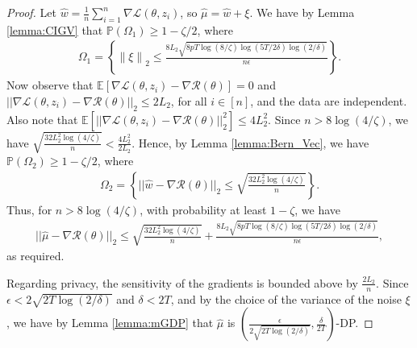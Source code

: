 \documentclass{article}
\begin{document}
\begin{proof}
Let $\widehat{w} = \frac{1}{n}\sum_{i = 1}^n\nabla \mathcal{L}(\theta, z_i)$, so $\widehat{\mu} = \widehat{w} + \xi$. We have by Lemma \ref{lemma:CIGV} that $\mathbb{P}(\Omega_1) \geq 1 - \zeta/2$, where
\begin{align*}
\Omega_1 = \left\{\left\|\xi\right\|_2 \leq \frac{8L_2\sqrt{8pT\log(8/\zeta)\log(5T/2\delta)\log(2/\delta)}}{n\epsilon} \right\}.
\end{align*}
Now observe that $\mathbb{E}[\nabla \mathcal{L}(\theta, z_i) - \nabla \mathcal{R}(\theta)] = 0$ and $||\nabla \mathcal{L}(\theta, z_i) - \nabla \mathcal{R}(\theta)||_2 \leq 2L_2$, for all $i \in [n]$, and the data are independent. Also note that $\mathbb{E}\left[||\nabla \mathcal{L}(\theta, z_i) - \nabla \mathcal{R}(\theta)||_2^2\right] \leq 4L_2^2$. Since $n > 8\log(4/\zeta)$, we have  $\sqrt{\frac{32L_2^2\log(4/\zeta)}{n}} < \frac{4L_2^2}{2L_2}$. Hence, by Lemma \ref{lemma:Bern_Vec}, we have $\mathbb{P}(\Omega_2) \geq 1 - \zeta/2$, where
\begin{align*}
\Omega_2 = \left\{||\widehat{w} - \nabla\mathcal{R}(\theta)||_2 \leq \sqrt{\frac{32L_2^2\log(4/\zeta)}{n}}\right\}.
\end{align*}
Thus, for $n > 8\log(4/\zeta)$, with probability at least $1 - \zeta$, we have
\begin{align*}
||\widehat{\mu} - \nabla\mathcal{R}(\theta)||_2 \leq \sqrt{\frac{32L_2^2\log(4/\zeta)}{n}} + \frac{8L_2\sqrt{8pT\log(8/\zeta)\log(5T/2\delta)\log(2/\delta)}}{n\epsilon},
\end{align*}
as required.

Regarding privacy, the sensitivity of the gradients is bounded above by $\frac{2L_2}{n}$. Since $\epsilon < 2\sqrt{2T\log(2/\delta)}$ and $\delta < 2T$, and by the choice of the variance of the noise $\xi$, we have by Lemma \ref{lemma:mGDP} that $\widehat{\mu}$ is $\left(\frac{\epsilon}{2\sqrt{2T\log(2/\delta)}}, \frac{\delta}{2T}\right)$-DP.
\end{proof}


\end{document}
